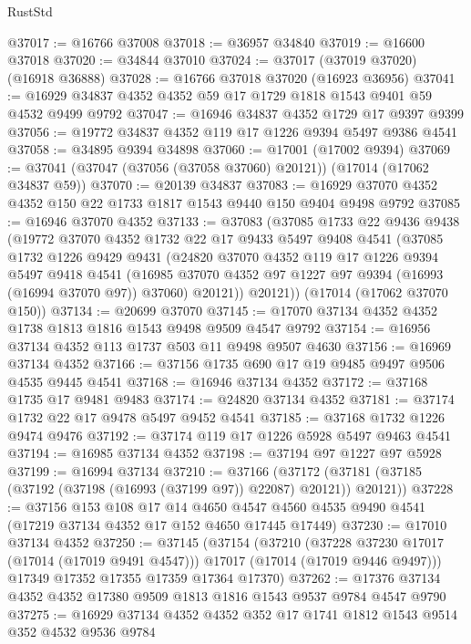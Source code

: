 \begin{lexlean}{RustStd}
\begin{coremodule}
@37017 := @16766 @37008
@37018 := @36957 @34840
@37019 := @16600 @37018
@37020 := @34844 @37010
@37024 := @37017 (@37019 @37020) (@16918 @36888)
@37028 := @16766 @37018 @37020 (@16923 @36956)
@37041 := @16929 @34837 @4352 @4352 @59 @17 @1729 @1818 @1543 @9401 @59 @4532 @9499 @9792
@37047 := @16946 @34837 @4352 @1729 @17 @9397 @9399
@37056 := @19772 @34837 @4352 @119 @17 @1226 @9394 @5497 @9386 @4541
@37058 := @34895 @9394 @34898
@37060 := @17001 (@17002 @9394)
@37069 := @37041 (@37047 (@37056 (@37058 @37060) @20121)) (@17014 (@17062 @34837 @59))
@37070 := @20139 @34837
@37083 := @16929 @37070 @4352 @4352 @150 @22 @1733 @1817 @1543 @9440 @150 @9404 @9498 @9792
@37085 := @16946 @37070 @4352
@37133 := @37083
    (@37085
      @1733
      @22
      @9436
      @9438
      (@19772
        @37070
        @4352
        @1732
        @22
        @17
        @9433
        @5497
        @9408
        @4541
        (@37085
          @1732
          @1226
          @9429
          @9431
          (@24820
            @37070
            @4352
            @119
            @17
            @1226
            @9394
            @5497
            @9418
            @4541
            (@16985 @37070 @4352 @97 @1227 @97 @9394 (@16993 (@16994 @37070 @97)) @37060)
            @20121))
        @20121))
    (@17014 (@17062 @37070 @150))
@37134 := @20699 @37070
@37145 := @17070 @37134 @4352 @4352 @1738 @1813 @1816 @1543 @9498 @9509 @4547 @9792
@37154 := @16956 @37134 @4352 @113 @1737 @503 @11 @9498 @9507 @4630
@37156 := @16969 @37134 @4352
@37166 := @37156 @1735 @690 @17 @19 @9485 @9497 @9506 @4535 @9445 @4541
@37168 := @16946 @37134 @4352
@37172 := @37168 @1735 @17 @9481 @9483
@37174 := @24820 @37134 @4352
@37181 := @37174 @1732 @22 @17 @9478 @5497 @9452 @4541
@37185 := @37168 @1732 @1226 @9474 @9476
@37192 := @37174 @119 @17 @1226 @5928 @5497 @9463 @4541
@37194 := @16985 @37134 @4352
@37198 := @37194 @97 @1227 @97 @5928
@37199 := @16994 @37134
@37210 := @37166
    (@37172 (@37181 (@37185 (@37192 (@37198 (@16993 (@37199 @97)) @22087) @20121)) @20121))
@37228 := @37156
    @153
    @108
    @17
    @14
    @4650
    @4547
    @4560
    @4535
    @9490
    @4541
    (@17219 @37134 @4352 @17 @152 @4650 @17445 @17449)
@37230 := @17010 @37134 @4352
@37250 := @37145
    (@37154
      (@37210
        (@37228 @37230 @17017 (@17014 (@17019 @9491 @4547)))
        @17017
        (@17014 (@17019 @9446 @9497)))
      @17349
      @17352
      @17355
      @17359
      @17364
      @17370)
@37262 := @17376 @37134 @4352 @4352 @17380 @9509 @1813 @1816 @1543 @9537 @9784 @4547 @9790
@37275 := @16929 @37134 @4352 @4352 @352 @17 @1741 @1812 @1543 @9514 @352 @4532 @9536 @9784

\end{coremodule}
\end{lexlean}
